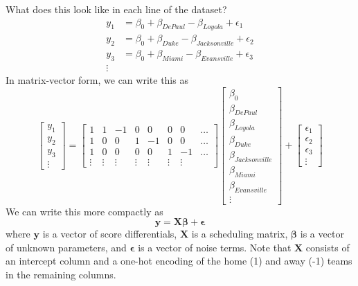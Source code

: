 \documentclass[twoside]{article}
\theoremstyle{definition}
\begin{document}
What does this look like in each line of the dataset?
\begin{align*}
    y_1 &= \beta_0 + \beta_{DePaul} - \beta_{Loyola} + \epsilon_1 \\
    y_2 &= \beta_0 + \beta_{Duke} - \beta_{Jacksonville} + \epsilon_2 \\
    y_3 &= \beta_0 + \beta_{Miami} - \beta_{Evansville} + \epsilon_3 \\
    \vdots
\end{align*}
In matrix-vector form, we can write this as
\begin{equation}
    \begin{bmatrix}
        y_1 \\
        y_2 \\
        y_3 \\
        \vdots
    \end{bmatrix}
    =
    \begin{bmatrix}
        1 & 1 & -1 & 0 & 0 & 0 & 0 &  \hdots \\
        1 & 0 & 0 & 1 & -1 & 0 & 0 & \hdots \\
        1 & 0 & 0 & 0 & 0 & 1 & -1 & \hdots \\
        \vdots & \vdots & \vdots & \vdots & \vdots & \vdots & \vdots
    \end{bmatrix}
    \begin{bmatrix}
        \beta_0 \\
        \beta_{DePaul} \\
        \beta_{Loyola} \\
        \beta_{Duke} \\
        \beta_{Jacksonville} \\
        \beta_{Miami} \\
        \beta_{Evansville} \\
        \vdots
    \end{bmatrix}
    +
    \begin{bmatrix}
        \epsilon_1 \\
        \epsilon_2 \\
        \epsilon_3 \\
        \vdots
    \end{bmatrix}
\end{equation}
We can write this more compactly as
\begin{equation}
    \mathbf{y} = \mathbf{X} \boldsymbol{\beta} + \boldsymbol{\epsilon}
\end{equation}
where $\mathbf{y}$ is a vector of score differentials, $\mathbf{X}$ is a scheduling matrix, $\boldsymbol{\beta}$ is a vector of unknown parameters, and $\boldsymbol{\epsilon}$ is a vector of noise terms. Note that $\mathbf{X}$ consists of an intercept column and a one-hot encoding of the home (1) and away (-1) teams in the remaining columns.
\end{document}
